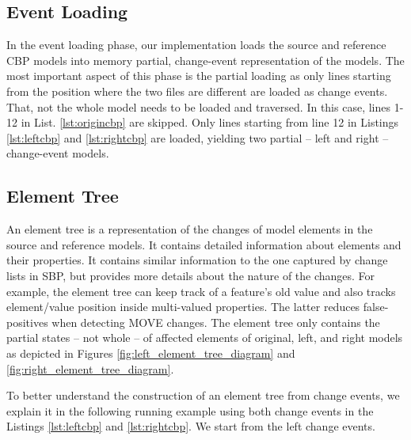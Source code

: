 \documentclass{jot}
\begin{document}
\subsection{Event Loading}
\label{sec:event_loading}
In the event loading phase, our implementation loads the source and reference CBP models into memory partial, change-event representation of the models.
The most important aspect of this phase is the partial loading as only lines starting from the position where the two files are different are loaded as change events.
That, not the whole model needs to be loaded and traversed.
In this case, lines 1-12 in List. \ref{lst:origincbp} are skipped.
Only lines starting from line 12 in Listings \ref{lst:leftcbp} and \ref{lst:rightcbp} are loaded, yielding two partial -- left and right -- change-event models. 

\subsection{Element Tree}
\label{sec:tree_construction}
An element tree is a representation of the changes of model elements in the source and reference models.
It contains detailed information about elements and their properties.
It contains similar information to the one captured by change lists in SBP, but provides more details about the nature of the changes.
For example, the element tree can keep track of a feature's old value and also tracks element/value position inside multi-valued properties. The latter reduces false-positives when detecting MOVE changes. 
The element tree only contains the partial states -- not whole -- of affected elements of original, left, and right models as depicted in Figures \ref{fig:left_element_tree_diagram} and \ref{fig:right_element_tree_diagram}.

To better understand the construction of an element tree from change events, we explain it in the following running example using both change events in the Listings \ref{lst:leftcbp} and \ref{lst:rightcbp}. We start from the left change events. 
\end{document}

